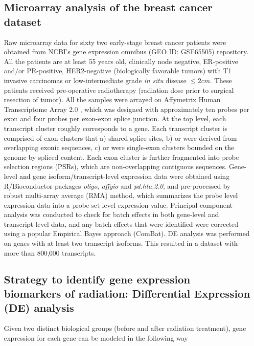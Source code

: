 \documentclass[hidelinks,11pt]{article}
\begin{document}
\subsection*{Microarray analysis of the breast cancer dataset}

Raw microarray data for sixty two early-stage breast cancer patients were obtained from NCBI's gene expression omnibus (GEO ID: GSE65505) repository. All the patients are at least 55 years old, clinically node negative, ER-positive and/or PR-positive, HER2-negative (biologically favorable tumors) with T1 invasive carcinomas or low-intermediate grade \emph{in situ} disease $\leq 2cm$. These patients received pre-operative radiotherapy (radiation dose prior to surgical resection of tumor). All the samples were arrayed on Affymetrix Human Transcriptome Array 2.0 \cite{affymetrix}, which was designed with approximately ten probes per exon and four probes per exon-exon splice junction. At the top level, each transcript cluster roughly corresponds to a gene. Each transcript cluster is comprised of exon clusters that  a) shared splice sites, b) or were derived from overlapping exonic sequences, c) or were single-exon clusters bounded on the genome by spliced content. Each exon cluster is further fragmented into probe selection regions (PSRs), which are non-overlapping contiguous sequences. Gene-level and gene isoform/transcript-level expression data were obtained using R/Bioconductor packages \emph{oligo}, \emph{affyio} and \emph{pd.hta.2.0}, and pre-processed by robust multi-array average (RMA) method, which summarizes the probe level expression data into a probe set level expression value. Principal component analysis was conducted to check for batch effects in both gene-level and transcript-level data, and any batch effects that were identified were corrected using a popular Empirical Bayes approach (ComBat). DE analysis was performed on genes with at least two transcript isoforms. This resulted in a dataset with more than 800,000 transcripts. 

\subsection*{Strategy to identify gene expression biomarkers of radiation: Differential Expression (DE) analysis}

Given two distinct biological groups (before and after radiation treatment), gene expression for each gene can be modeled in the following way
\end{document}
